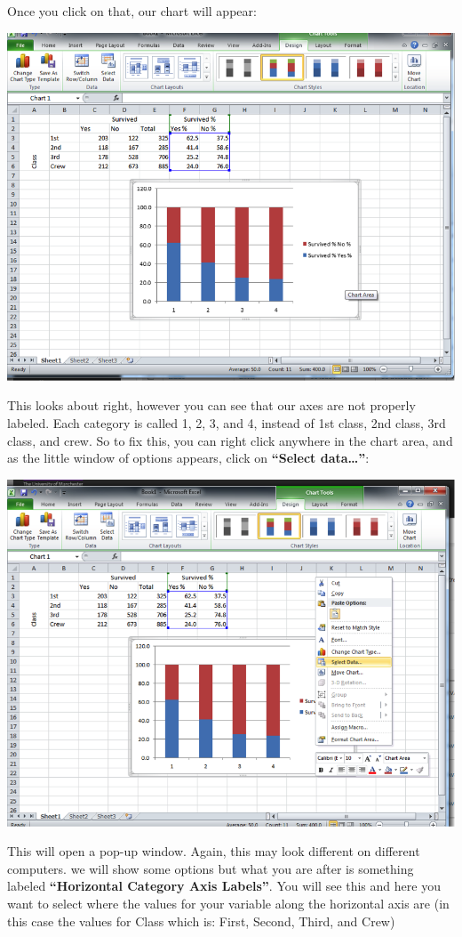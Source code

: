 \documentclass[
]{book}
\begin{document}
Once you click on that, our chart will appear:

\includegraphics{imgs/stacked_col_2.png}

This looks about right, however you can see that our axes are not properly labeled. Each category is called 1, 2, 3, and 4, instead of 1st class, 2nd class, 3rd class, and crew. So to fix this, you can right click anywhere in the chart area, and as the little window of options appears, click on \textbf{``Select data\ldots{}''}:

\includegraphics{imgs/stacked_col_3.png}

This will open a pop-up window. Again, this may look different on different computers. we will show some options but what you are after is something labeled \textbf{``Horizontal Category Axis Labels''}. You will see this and here you want to select where the values for your variable along the horizontal axis are (in this case the values for Class which is: First, Second, Third, and Crew)
\end{document}
